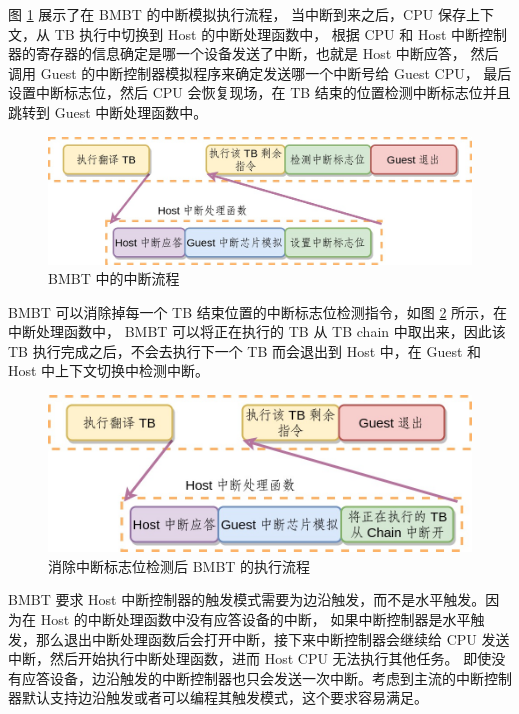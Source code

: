 图 \ref{fig:bmbt_interrupt_flow} 展示了在 BMBT 的中断模拟执行流程，
当中断到来之后，CPU 保存上下文，从 TB 执行中切换到 Host 的中断处理函数中，
根据 CPU 和 Host 中断控制器的寄存器的信息确定是哪一个设备发送了中断，也就是 Host 中断应答，
然后调用 Guest 的中断控制器模拟程序来确定发送哪一个中断号给 Guest CPU，
最后设置中断标志位，然后 CPU 会恢复现场，在 TB 结束的位置检测中断标志位并且跳转到 Guest 中断处理函数中。

\begin{figure}[!htbp]
	\centering
	\includegraphics[width=1.0\textwidth]{./images/bmbt-interrupt-codeflow.jpg}
	\caption{BMBT 中的中断流程}
	\label{fig:bmbt_interrupt_flow}
\end{figure}

BMBT 可以消除掉每一个 TB 结束位置的中断标志位检测指令，如图 \ref{fig:bmbt_interrupt_flow2} 所示，在中断处理函数中，
BMBT 可以将正在执行的 TB 从 TB chain 中取出来，因此该 TB 执行完成之后，不会去执行下一个 TB
而会退出到 Host 中，在 Guest 和 Host 中上下文切换中检测中断。

\begin{figure}[!htbp]
	\centering
	\includegraphics[width=1.0\textwidth]{./images/bmbt-interrupt-codeflow2.jpg}
	\caption{消除中断标志位检测后 BMBT 的执行流程}
	\label{fig:bmbt_interrupt_flow2}
\end{figure}

BMBT 要求 Host 中断控制器的触发模式需要为边沿触发，而不是水平触发。因为在 Host 的中断处理函数中没有应答设备的中断，
如果中断控制器是水平触发，那么退出中断处理函数后会打开中断，接下来中断控制器会继续给 CPU 发送中断，然后开始执行中断处理函数，进而 Host CPU 无法执行其他任务。
即使没有应答设备，边沿触发的中断控制器也只会发送一次中断。考虑到主流的中断控制器默认支持边沿触发或者可以编程其触发模式，这个要求容易满足。

